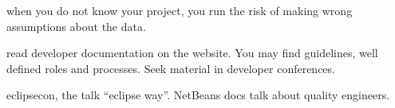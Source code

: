 
\Problem

\Context

when you do not know your project, you run the risk of making wrong assumptions about the data.

\Solution

read developer documentation on the website. You may find guidelines, well defined roles and processes. Seek material in developer conferences.

\Example

eclipsecon, the talk “eclipse way”. NetBeans docs talk about quality engineers.
